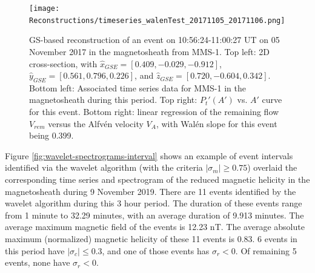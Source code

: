 


\begin{figure}
    \centering
    \texttt{[image: Reconstructions/timeseries\_walenTest\_20171105\_20171106.png]}
    \caption[GS event reconstructions]{GS-based reconstruction of an event on 10:56:24-11:00:27 UT on 05 November 2017 in the magnetosheath from MMS-1. Top left: 2D cross-section, with $\hat{x}_{GSE}=[0.409, -0.029, -0.912]$, $\hat{y}_{GSE}=[0.561, 0.796, 0.226]$, and $\hat{z}_{GSE}=[0.720, -0.604, 0.342]$. Bottom left: Associated time series data for MMS-1 in the magnetosheath during this period. Top right: $P_t'(A')$ vs. $A'$ curve for this event. Bottom right: linear regression of the remaining flow $V_{rem}$ versus the Alfv\'en velocity $V_A$, with Wal\'en slope for this event being 0.399.}
    \label{fig:reconstruction-quasistatic}
\end{figure}


Figure \ref{fig:wavelet-spectrograms-interval} shows an example of event intervals identified via the wavelet algorithm (with the criteria $|\sigma_m|\geq 0.75$) overlaid the corresponding time series and spectrogram of the reduced magnetic helicity in the magnetosheath during 9 November 2019. There are 11 events identified by the wavelet algorithm during this 3 hour period. The duration of these events range from 1 minute to 32.29 minutes, with an average duration of 9.913 minutes. The average maximum magnetic field of the events is 12.23 nT. The average absolute maximum (normalized) magnetic helicity of these 11 events is 0.83. 6 events in this period have $|\sigma_c|\leq 0.3$, and one of those events has $\sigma_r<0$. Of remaining 5 events, none have $\sigma_r<0$.


